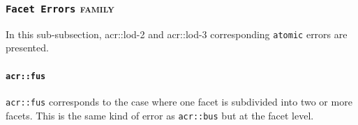         \subsubsection{\texttt{Facet Errors} \textsc{family}}
            In this sub-subsection, \gls{acr::lod}-2 and \gls{acr::lod}-3 corresponding \texttt{atomic} errors are presented.

            \paragraph{\texttt{\acrlong*{acr::fus}}}
                \texttt{\gls{acr::fus}} corresponds to the case where one facet is subdivided into two or more facets.
                This is the same kind of error as \texttt{\gls{acr::bus}} but at the facet level.\\

